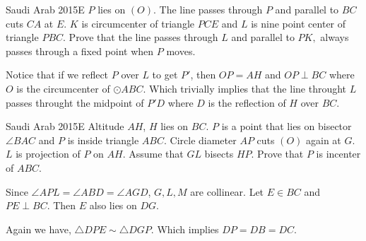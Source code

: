 \begin{minipage}{.5\textwidth} 

\end{minipage}\hfill%
\begin{minipage}{.48\textwidth} 
\end{minipage}

\begin{minipage}{.6\linewidth}
    {Saudi Arab 2015}{E}{
        $P$ lies on $(O)$. The line passes through $P$ and parallel to $BC$
        cuts $CA$ at $E$. $K$ is circumcenter of triangle $PCE$ and $L$ is
        nine point center of triangle $PBC$. Prove that the line passes
        through $L$ and parallel to $PK,$ always passes through a fixed point
        when $P$ moves.
    }

    \begin{solution}[Construction] 
        Notice that if we reflect $ P $ over $ L $
        to get $ P' $, then $ OP=AH $ and $ OP\perp BC $ where $ O $ is the
        circumcenter of $ \odot ABC $. Which trivially implies that the line
        throught $ L $ passes throught the midpoint of $ P'D $ where $ D $ is
        the reflection of $ H $ over $ BC $.  
    \end{solution} 

    {Saudi Arab 2015}{E}{
        Altitude $AH$, $H$ lies on $BC$. $P$ is a point that
        lies on bisector $\angle BAC$ and $P$ is inside triangle $ABC$. Circle
        diameter $AP$ cuts $(O)$ again at $G$. $L$ is projection of $P$ on $AH$.
        Assume that $GL$ bisects $HP$. Prove that $P$ is incenter of $ABC$.
    }

    \begin{solution} Since $ \angle APL = \angle ABD = \angle AGD
        $, $ G, L, M $ are collinear. Let $ E\in BC $ and $ PE\perp BC $. Then
        $ E $ also lies on $ DG $. 

        Again we have, $ \triangle DPE\sim \triangle DGP $. Which implies $
        DP=DB=DC $.  
    \end{solution} 
\end{minipage}\hfill%
\begin{minipage}{.35\linewidth}
\end{minipage}


